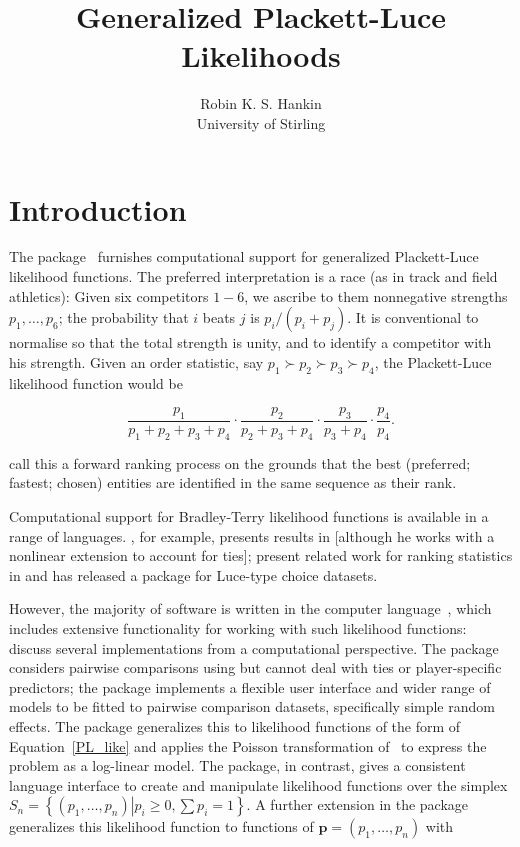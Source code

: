 \documentclass[article]{jss}
\author{Robin K. S. Hankin\\University of Stirling}
\title{Generalized Plackett-Luce Likelihoods}
\begin{document}
\section{Introduction}

The  package~\citep{hankin2009,hankin2017} furnishes
computational support for generalized
Plackett-Luce~\citep{plackett1975} likelihood functions.  The
preferred interpretation is a race (as in track and field athletics):
Given six competitors $1-6$, we ascribe to them nonnegative strengths
$p_1,\ldots, p_6$; the probability that $i$ beats $j$ is
$p_i/(p_i+p_j)$.  It is conventional to normalise so that the total
strength is unity, and to identify a competitor with his strength.
Given an order statistic, say $p_1\succ p_2\succ p_3\succ p_4$, the
Plackett-Luce likelihood function would be

\begin{equation}\label{PL_like}
  \frac{p_1}{p_1+p_2+p_3+p_4}\cdot
  \frac{p_2}{    p_2+p_3+p_4}\cdot
  \frac{p_3}{        p_3+p_4}\cdot
  \frac{p_4}{            p_4}.
\end{equation}


\citet{mollica2014} call this a forward ranking process on the grounds
that the best (preferred; fastest; chosen) entities are identified in
the same sequence as their rank.  

Computational support for Bradley-Terry likelihood functions is
available in a range of languages.  \cite{hunter2004}, for example,
presents results in  [although he works with a
nonlinear extension to account for ties]; \cite{allison1994} present
related work for ranking statistics in  and
\cite{maystre2022} has released a  package for
Luce-type choice datasets.

However, the majority of software is written in the 
computer language~\citep{rcore2023}, which includes extensive
functionality for working with such likelihood functions:
\cite{turner2020} discuss several implementations from a computational
perspective.  The  package \citep{firth2005}
considers pairwise comparisons using  but cannot deal
with ties or player-specific predictors; the 
package \citep{turner2012} implements a flexible user interface and
wider range of models to be fitted to pairwise comparison datasets,
specifically simple random effects.  The  package
\citep{turner2020} generalizes this to likelihood functions of the
form of Equation~\ref{PL_like} and applies the Poisson transformation
of~\cite{baker1994} to express the problem as a log-linear model.  The
 package, in contrast, gives a consistent language
interface to create and manipulate likelihood functions over the
simplex ${S}_n=\left\lbrace\left(p_1,\ldots,p_n\right)\left|p_i\geq
0,\sum p_i=1\right.\right\rbrace$.  A further extension in the package
generalizes this likelihood function to functions of ${\mathbf
p}=(p_1,\ldots,p_n)$ with
\end{document}
